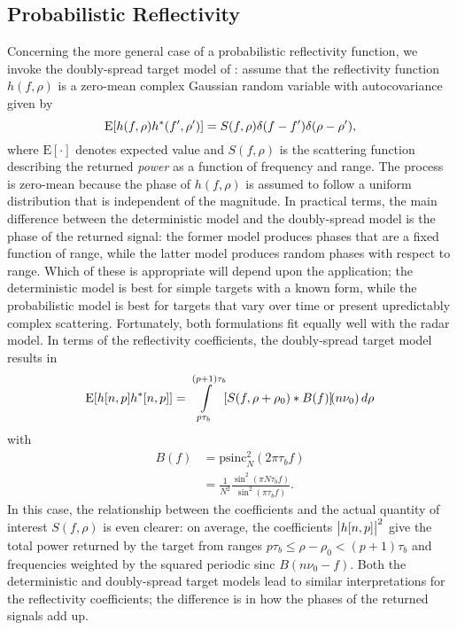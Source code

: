 \subsection{Probabilistic Reflectivity}
Concerning the more general case of a probabilistic reflectivity function, we invoke the doubly-spread target model of \textcite{VTre01}: assume that the reflectivity function $h(f, \rho)$ is a zero-mean complex Gaussian random variable with autocovariance given by
\begin{equation}
 \mathrm{E}\brak*{h(f, \rho) h^{*}(f', \rho')} = S(f, \rho) \delta(f - f') \delta(\rho - \rho'),
\end{equation}
where $\mathrm{E}[\cdot]$ denotes expected value and $S(f, \rho)$ is the scattering function describing the returned \emph{power} as a function of frequency and range. The process is zero-mean because the phase of $h(f, \rho)$ is assumed to follow a uniform distribution that is independent of the magnitude. In practical terms, the main difference between the deterministic model and the doubly-spread model is the phase of the returned signal: the former model produces phases that are a fixed function of range, while the latter model produces random phases with respect to range. Which of these is appropriate will depend upon the application; the deterministic model is best for simple targets with a known form, while the probabilistic model is best for targets that vary over time or present upredictably complex scattering. Fortunately, both formulations fit equally well with the radar model. In terms of the reflectivity coefficients, the doubly-spread target model results in
\begin{equation}\label{eq:reflectivity_coefficients_doubly_spread}
 \mathrm{E}\brak*{h[n,p]h^*[n,p]} = \int\limits_{p\tau_b}^{(p+1)\tau_b} \brak*{S(f, \rho + \rho_0) * B(f)}\!(n\nu_0) \dee\rho
\end{equation}
with
\begin{align}
 B(f) &= \mathrm{psinc}_N^2(2\pi \tau_b f)\\
 &= \frac{1}{N^2} \frac{\sin^2(\pi N\tau_b f)}{\sin^2(\pi \tau_b f)}.
\end{align}
In this case, the relationship between the coefficients and the actual quantity of interest $S(f, \rho)$ is even clearer: on average, the coefficients $\abs[\big]{h[n,p]}^2$ give the total power returned by the target from ranges $p\tau_b \le \rho - \rho_0 < (p+1)\tau_b$ and frequencies weighted by the squared periodic sinc $B(n\nu_0 - f)$. Both the deterministic and doubly-spread target models lead to similar interpretations for the reflectivity coefficients; the difference is in how the phases of the returned signals add up.

